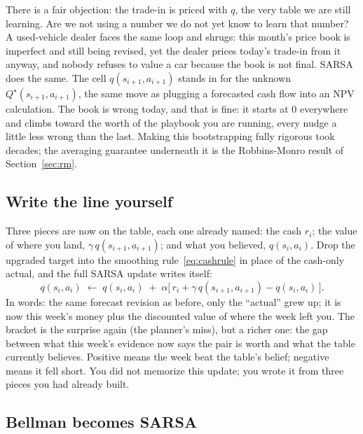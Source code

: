 \documentclass[11pt,a4paper]{article}
\theoremstyle{definition}
\theoremstyle{remark}
\numberwithin{equation}{section}
\begin{document}
There is a fair objection: the trade-in is priced with $q$, the very table we are still
learning. Are we not using a number we do not yet know to learn that number? A used-vehicle
dealer faces the same loop and shrugs: this month's price book is imperfect and still being
revised, yet the dealer prices today's trade-in from it anyway, and nobody refuses to value a
car because the book is not final. SARSA does the same. The cell $q(s_{i+1}, a_{i+1})$ stands
in for the unknown $Q^\star(s_{i+1}, a_{i+1})$, the same move as plugging a forecasted cash
flow into an NPV calculation. The book is wrong today, and that is fine: it starts at $0$
everywhere and climbs toward the worth of the playbook you are running, every nudge a little
less wrong than the last. Making this bootstrapping fully rigorous took decades; the averaging
guarantee underneath it is the Robbins-Monro result of Section~\ref{sec:rm}.

\subsection*{Write the line yourself}

Three pieces are now on the table, each one already named: the cash $r_i$; the value of where
you land, $\gamma\, q(s_{i+1}, a_{i+1})$; and what you believed, $q(s_i, a_i)$. Drop the
upgraded target into the smoothing rule~\eqref{eq:cashrule} in place of the cash-only actual,
and the full SARSA update writes itself:
\begin{equation}\label{eq:sarsa}
q(s_i, a_i) \;\leftarrow\; q(s_i, a_i)
\;+\; \alpha \bigl[\, r_i + \gamma\, q(s_{i+1}, a_{i+1}) - q(s_i, a_i) \,\bigr].
\end{equation}
In words: the same forecast revision as before, only the ``actual'' grew up; it is now this
week's money plus the discounted value of where the week left you. The bracket is the surprise
again (the planner's miss), but a richer one: the gap between what this week's evidence now
says the pair is worth and what the table currently believes. Positive means the week beat the
table's belief; negative means it fell short. You did not memorize this update; you wrote it
from three pieces you had already built.

\subsection*{Bellman becomes SARSA}
\end{document}
